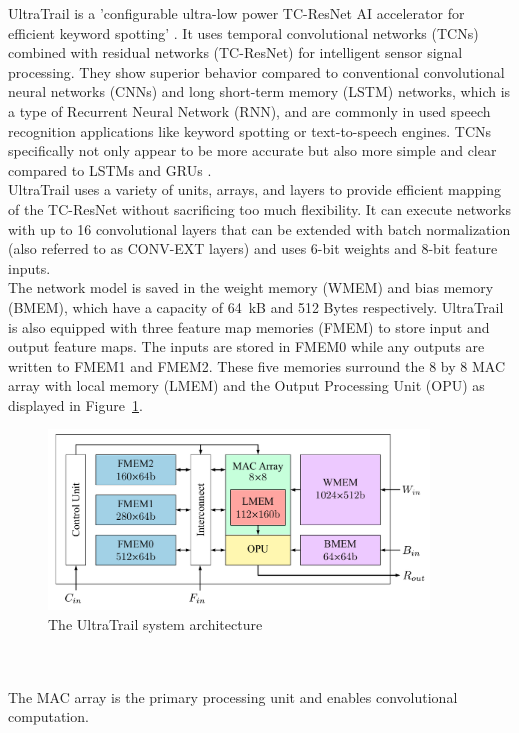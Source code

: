 UltraTrail is a 'configurable ultra-low power TC-ResNet AI accelerator for efficient keyword spotting' \cite{ultratrail}.
It uses temporal convolutional networks (TCNs) combined with residual networks (TC-ResNet) for intelligent sensor signal processing.
They show superior behavior compared to conventional convolutional neural networks (CNNs) and long short-term memory (LSTM) networks,
which is a type of Recurrent Neural Network (RNN), and are commonly in used speech recognition applications like keyword spotting or text-to-speech engines.
TCNs specifically not only appear to be more accurate but also more simple and clear compared to LSTMs and GRUs \cite[Ch I]{ultratrail}.\\
UltraTrail uses a variety of units, arrays, and layers to provide efficient mapping of the TC-ResNet without sacrificing too much flexibility.
It can execute networks with up to 16 convolutional layers that can be extended with batch normalization (also referred to as CONV-EXT layers)
and uses 6-bit weights and 8-bit feature inputs.\\
The network model is saved in the weight memory (WMEM) and bias memory (BMEM), which
have a capacity of 64 kB and 512 Bytes respectively.
UltraTrail is also equipped with three feature map memories (FMEM) to store input and output
feature maps. The inputs are stored in FMEM0 while any outputs are written to FMEM1 and FMEM2.
These five memories surround the 8 by 8 MAC array with local memory (LMEM) and the Output Processing Unit (OPU) as displayed in Figure~\ref{fig:ultratrail_arch}.
\begin{figure}[htb]
    \centering
    \includegraphics[width=0.9\textwidth]{figures/ultratrail.png}
    \caption[Illustration: The UltraTrail system architecture (Fig. 5)\cite{ultratrail}]{The UltraTrail system architecture}
    \label{fig:ultratrail_arch}
\end{figure}
\\\\
The MAC array is the primary processing unit and enables convolutional computation.
